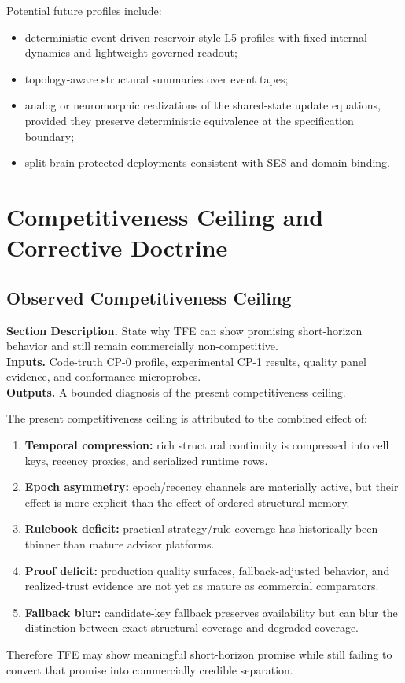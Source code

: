 \documentclass[11pt]{report}
\newcommand{\meta}[3]{\textbf{Section Description.} #1\\
\textbf{Inputs.} #2\\
\textbf{Outputs.} #3\par}
\begin{document}
Potential future profiles include:
\begin{itemize}
    \item deterministic event-driven reservoir-style L5 profiles with fixed internal dynamics and lightweight governed readout;
    \item topology-aware structural summaries over event tapes;
    \item analog or neuromorphic realizations of the shared-state update equations, provided they preserve deterministic equivalence at the specification boundary;
    \item split-brain protected deployments consistent with SES and domain binding.
\end{itemize}



\chapter{Competitiveness Ceiling and Corrective Doctrine}
\section{Observed Competitiveness Ceiling}
\meta{State why TFE can show promising short-horizon behavior and still remain commercially non-competitive.}{Code-truth CP-0 profile, experimental CP-1 results, quality panel evidence, and conformance microprobes.}{A bounded diagnosis of the present competitiveness ceiling.}

The present competitiveness ceiling is attributed to the combined effect of:
\begin{enumerate}[leftmargin=1.2cm]
    \item \textbf{Temporal compression:} rich structural continuity is compressed into cell keys, recency proxies, and serialized runtime rows.
    \item \textbf{Epoch asymmetry:} epoch/recency channels are materially active, but their effect is more explicit than the effect of ordered structural memory.
    \item \textbf{Rulebook deficit:} practical strategy/rule coverage has historically been thinner than mature advisor platforms.
    \item \textbf{Proof deficit:} production quality surfaces, fallback-adjusted behavior, and realized-trust evidence are not yet as mature as commercial comparators.
    \item \textbf{Fallback blur:} candidate-key fallback preserves availability but can blur the distinction between exact structural coverage and degraded coverage.
\end{enumerate}
Therefore TFE may show meaningful short-horizon promise while still failing to convert that promise into commercially credible separation.
\end{document}
